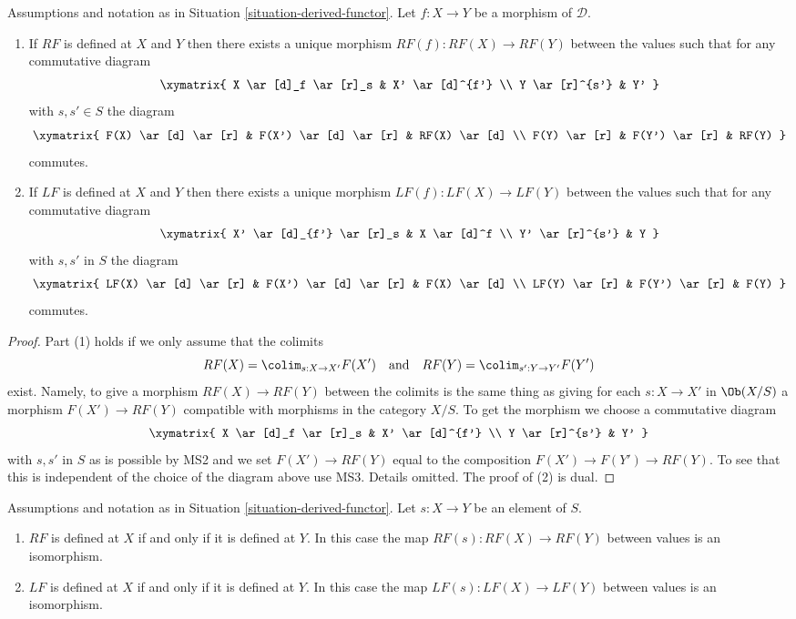 \begin{lemma}
\label{lemma-derived-functor}
Assumptions and notation as in
Situation \ref{situation-derived-functor}.
Let $f : X \to Y$ be a morphism of $\mathcal{D}$.
\begin{enumerate}
\item If $RF$ is defined at $X$ and $Y$ then there exists a unique
morphism $RF(f) : RF(X) \to RF(Y)$ between the values such that
for any commutative diagram
$$
\xymatrix{
X \ar[d]_f \ar[r]_s & X' \ar[d]^{f'} \\
Y \ar[r]^{s'} & Y'
}
$$
with $s, s' \in S$ the diagram
$$
\xymatrix{
F(X) \ar[d] \ar[r] & F(X') \ar[d] \ar[r] & RF(X) \ar[d] \\
F(Y) \ar[r] & F(Y') \ar[r] & RF(Y)
}
$$
commutes.
\item If $LF$ is defined at $X$ and $Y$ then there exists a unique
morphism $LF(f) : LF(X) \to LF(Y)$ between the values such that
for any commutative diagram
$$
\xymatrix{
X' \ar[d]_{f'} \ar[r]_s & X \ar[d]^f \\
Y' \ar[r]^{s'} & Y
}
$$
with $s, s'$ in $S$ the diagram
$$
\xymatrix{
LF(X) \ar[d] \ar[r] & F(X') \ar[d] \ar[r] & F(X) \ar[d] \\
LF(Y) \ar[r] & F(Y') \ar[r] & F(Y)
}
$$
commutes.
\end{enumerate}
\end{lemma}

\begin{proof}
Part (1) holds if we only assume that the colimits
$$
RF(X) = \colim_{s : X \to X'} F(X')
\quad\text{and}\quad
RF(Y) = \colim_{s' : Y \to Y'} F(Y')
$$
exist. Namely, to give a morphism $RF(X) \to RF(Y)$ between the colimits
is the same thing as giving for each $s : X \to X'$ in $\Ob(X/S)$
a morphism $F(X') \to RF(Y)$ compatible with morphisms in the category
$X/S$. To get the morphism we choose a commutative diagram
$$
\xymatrix{
X \ar[d]_f \ar[r]_s & X' \ar[d]^{f'} \\
Y \ar[r]^{s'} & Y'
}
$$
with $s, s'$ in $S$ as is possible by MS2 and we set
$F(X') \to RF(Y)$ equal to the composition $F(X') \to F(Y') \to RF(Y)$.
To see that this is independent of the choice of the diagram above use
MS3. Details omitted. The proof of (2) is dual.
\end{proof}

\begin{lemma}
\label{lemma-derived-inverts}
Assumptions and notation as in
Situation \ref{situation-derived-functor}.
Let $s : X \to Y$ be an element of $S$.
\begin{enumerate}
\item $RF$ is defined at $X$ if and only if it is defined at $Y$.
In this case the map $RF(s) : RF(X) \to RF(Y)$ between values
is an isomorphism.
\item $LF$ is defined at $X$ if and only if it is defined at $Y$.
In this case the map $LF(s) : LF(X) \to LF(Y)$ between values
is an isomorphism.
\end{enumerate}
\end{lemma}

